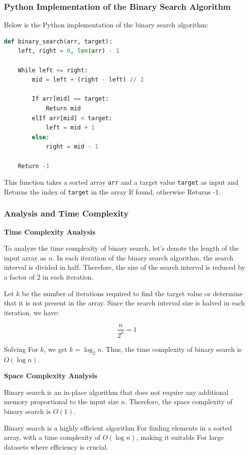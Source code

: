 \documentclass[12pt]{book} %
\begin{document}
\subsubsection{Python Implementation of the Binary Search Algorithm}
Below is the Python implementation of the binary search algorithm:

\begin{lstlisting}[language=Python]
def binary_search(arr, target):
    left, right = 0, len(arr) - 1
    
    While left <= right:
        mid = left + (right - left) // 2
        
        If arr[mid] == target:
            Return mid
        elIf arr[mid] < target:
            left = mid + 1
        else:
            right = mid - 1
    
    Return -1
\end{lstlisting}

This function takes a sorted array \texttt{arr} and a target value \texttt{target} as input and Returns the index of \texttt{target} in the array If found, otherwise Returns -1.
\subsubsection{Analysis and Time Complexity}
\textbf{Time Complexity Analysis}

To analyze the time complexity of binary search, let's denote the length of the input array as \(n\). In each iteration of the binary search algorithm, the search interval is divided in half. Therefore, the size of the search interval is reduced by a factor of 2 in each iteration.

Let \(k\) be the number of iterations required to find the target value or determine that it is not present in the array. Since the search interval size is halved in each iteration, we have:

\[
\frac{n}{2^k} = 1
\]

Solving For \(k\), we get \(k = \log_2 n\). Thus, the time complexity of binary search is \(O(\log n)\).

\textbf{Space Complexity Analysis}

Binary search is an in-place algorithm that does not require any additional memory proportional to the input size \(n\). Therefore, the space complexity of binary search is \(O(1)\).

Binary search is a highly efficient algorithm For finding elements in a sorted array, with a time complexity of \(O(\log n)\), making it suitable For large datasets where efficiency is crucial.
\end{document}
